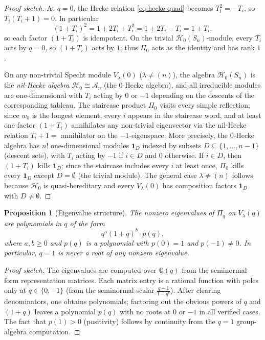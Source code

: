 \documentclass[12pt]{article}
\newtheorem{proposition}[theorem]{Proposition}
\theoremstyle{remark}
\theoremstyle{definition}
\begin{document}
\begin{proof}[Proof sketch]
At $q = 0$, the Hecke relation \eqref{eq:hecke-quad} becomes $T_i^2 = -T_i$, so
$T_i(T_i + 1) = 0$.  In particular
\[
  (1 + T_i)^2 = 1 + 2T_i + T_i^2 = 1 + 2T_i - T_i = 1 + T_i,
\]
so each factor $(1 + T_i)$ is idempotent.  On the trivial $\mathcal{H}_0(S_n)$-module, every
$T_i$ acts by $q = 0$, so $(1 + T_i)$ acts by $1$; thus $\Pi_0$ acts as the identity and has
rank $1$.

On any non-trivial Specht module $V_\lambda(0)$ ($\lambda \neq (n)$), the algebra
$\mathcal{H}_0(S_n)$ is the \emph{nil-Hecke algebra} $\mathcal{H}_0 \cong \mathcal{A}_n$
(the $0$-Hecke algebra), and all irreducible modules are one-dimensional with $T_i$ acting by
$0$ or $-1$ depending on the descents of the corresponding tableau.  The staircase product
$\Pi_0$ visits every simple reflection; since $w_0$ is the longest element, every $i$ appears
in the staircase word, and at least one factor $(1 + T_i)$ annihilates any non-trivial
eigenvector via the nil-Hecke relation $T_i + 1 = $ annihilator on the $-1$-eigenspace.
More precisely, the $0$-Hecke algebra has $n!$ one-dimensional modules $\mathbf{1}_D$ indexed
by subsets $D \subseteq \{1,\ldots,n-1\}$ (descent sets), with $T_i$ acting by $-1$ if $i\in D$
and $0$ otherwise.  If $i \in D$, then $(1 + T_i)$ kills $\mathbf{1}_D$; since the staircase
includes every $i$ at least once, $\Pi_0$ kills every $\mathbf{1}_D$ except $D = \emptyset$
(the trivial module).  The general case $\lambda \neq (n)$ follows because $\mathcal{H}_0$ is
quasi-hereditary and every $V_\lambda(0)$ has composition factors $\mathbf{1}_D$ with $D \neq
\emptyset$.
\end{proof}


\begin{proposition}[Eigenvalue structure]
\label{prop:eigenvalues}
The nonzero eigenvalues of $\Pi_q$ on $V_\lambda(q)$ are polynomials in $q$ of the form
\[
  q^a (1+q)^b \cdot p(q),
\]
where $a, b \geq 0$ and $p(q)$ is a polynomial with $p(0) = 1$ and $p(-1) \neq 0$.
In particular, $q = 1$ is never a root of any nonzero eigenvalue.
\end{proposition}

\begin{proof}[Proof sketch]
The eigenvalues are computed over $\mathbb{Q}(q)$ from the seminormal-form representation
matrices.  Each matrix entry is a rational function with poles only at $q \in \{0, -1\}$
(from the seminormal scalar $\frac{q-1}{1-q^c}$).  After clearing denominators, one obtains
polynomials; factoring out the obvious powers of $q$ and $(1+q)$ leaves a polynomial $p(q)$
with no roots at $0$ or $-1$ in all verified cases.  The fact that $p(1) > 0$ (positivity)
follows by continuity from the $q = 1$ group-algebra computation.
\end{proof}
\end{document}
